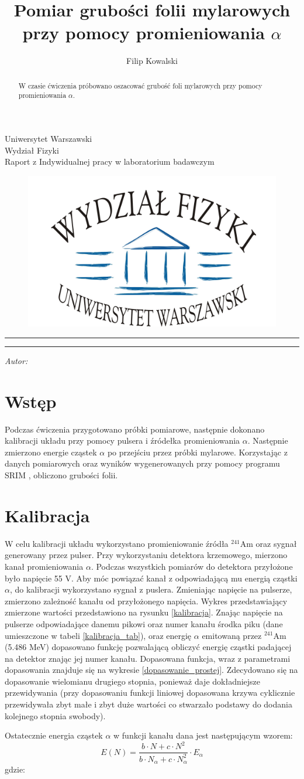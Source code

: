 \documentclass[12pt,a4paper]{article}
\author{Filip Kowalski }
\title{Pomiar grubości folii mylarowych przy pomocy promieniowania $\alpha$}
\makeatletter
\newcommand{\linia}{\rule{\linewidth}{0.4mm}}
\newcommand{\Ameryk}{${}^{241}_{}{}$Am }
\renewcommand{\maketitle}{\begin{titlepage}
    \vspace*{1cm}
    \begin{center}\small
    Uniwersytet Warszawski\\
    Wydział Fizyki\\
   Raport z Indywidualnej pracy w laboratorium badawczym
    \end{center}
    
\begin{figure}[h]
    \centering
    \includegraphics[scale=0.5]{logo.jpg}
    \end{figure}


    \vspace{3cm}
    \noindent\linia
    \begin{center}
      \LARGE \textsc{\@title}
         \end{center}
     \linia
    \vspace{0.5cm}
    \begin{flushright}
    \begin{minipage}{5cm}
    \textit{\small Autor:}\\
    \normalsize \textsc{\@author} \par
    \end{minipage}
    \vspace{5cm}
    
     \end{flushright}
    \vspace*{\stretch{6}}
    \begin{center}
    \@date
    \end{center}
         \end{titlepage}}
\makeatother
\begin{document}
\maketitle
\begin{abstract}
W czasie ćwiczenia próbowano oszacować grubość foli mylarowych przy pomocy promieniowania $\alpha$. 
\end{abstract}
\section{Wstęp}
Podczas ćwiczenia przygotowano próbki pomiarowe, następnie dokonano kalibracji układu przy pomocy pulsera i źródełka promieniowania $\alpha$. Następnie zmierzono energie cząstek $\alpha$ po przejściu przez próbki mylarowe. Korzystając z danych pomiarowych oraz wyników wygenerowanych przy pomocy programu SRIM \cite{srim}, obliczono grubości folii.

\section{Kalibracja}
W celu kalibracji układu wykorzystano promieniowanie źródła \Ameryk oraz sygnał generowany przez pulser. Przy wykorzystaniu detektora krzemowego, mierzono kanał promieniowania $\alpha$. Podczas wszystkich pomiarów do detektora przyłożone było napięcie 55 V. Aby móc powiązać kanał z odpowiadającą mu energią cząstki $\alpha$, do kalibracji wykorzystano sygnał z puslera. Zmieniając napięcie  na pulserze, zmierzono zależność kanału od przyłożonego napięcia. Wykres przedstawiający zmierzone wartości przedstawiono na rysunku \ref{kalibracja}. Znając napięcie na pulserze odpowiadające danemu pikowi oraz numer kanału środka piku (dane umieszczone w tabeli \ref{kalibracja_tab}), oraz energię $\alpha$ emitowaną przez \Ameryk  (5.486 MeV) dopasowano funkcję pozwalającą obliczyć energię cząstki padającej na detektor znając jej numer kanału. Dopasowana funkcja, wraz z parametrami dopasowania znajduje się na wykresie \ref{dopasowanie_prostej}. Zdecydowano się na dopasowanie wielomianu drugiego stopnia, ponieważ daje dokładniejsze przewidywania (przy dopasowaniu funkcji liniowej dopasowana krzywa cyklicznie przewidywała zbyt małe i zbyt duże wartości co stwarzało podstawy do dodania kolejnego stopnia swobody). 

Ostatecznie energia cząstek $\alpha$ w funkcji kanału dana jest następującym wzorem:
\[
\label{wzorenergia}
E(N)= \frac{b \cdot N+c \cdot N^2}{b \cdot  N_\alpha+c \cdot N_\alpha ^2 } \cdot E_\alpha\] 
gdzie: 
\end{document}
